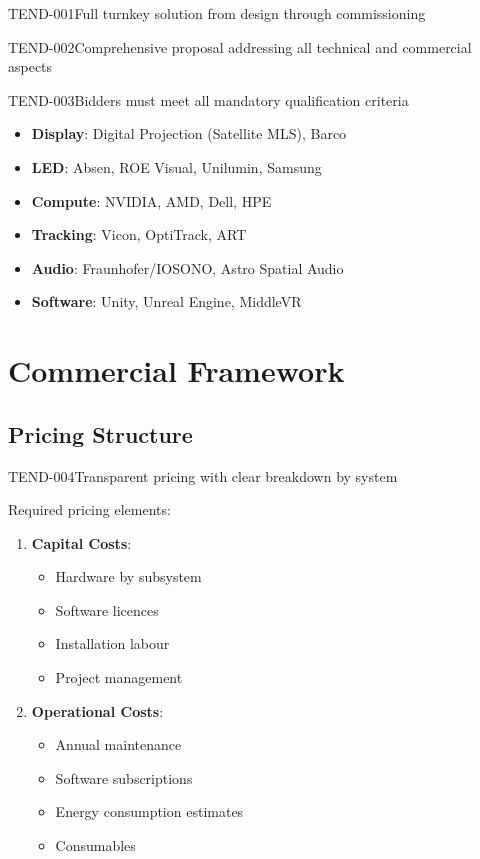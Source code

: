 \begin{requirement}{TEND-001}{Full turnkey solution from design through commissioning}
\begin{requirement}{TEND-002}{Comprehensive proposal addressing all technical and commercial aspects}
\begin{requirement}{TEND-003}{Bidders must meet all mandatory qualification criteria}
\begin{itemize}
    \item \textbf{Display}: Digital Projection (Satellite MLS), Barco
    \item \textbf{LED}: Absen, ROE Visual, Unilumin, Samsung
    \item \textbf{Compute}: NVIDIA, AMD, Dell, HPE
    \item \textbf{Tracking}: Vicon, OptiTrack, ART
    \item \textbf{Audio}: Fraunhofer/IOSONO, Astro Spatial Audio
    \item \textbf{Software}: Unity, Unreal Engine, MiddleVR
\end{itemize}

\section{Commercial Framework}

\subsection{Pricing Structure}

\begin{requirement}{TEND-004}{Transparent pricing with clear breakdown by system}

Required pricing elements:

\begin{enumerate}
    \item \textbf{Capital Costs}:
        \begin{itemize}
            \item Hardware by subsystem
            \item Software licences
            \item Installation labour
            \item Project management
        \end{itemize}

    \item \textbf{Operational Costs}:
        \begin{itemize}
            \item Annual maintenance
            \item Software subscriptions
            \item Energy consumption estimates
            \item Consumables
        \end{itemize}


\end{enumerate}
\end{requirement}
\end{requirement}
\end{requirement}
\end{requirement}
